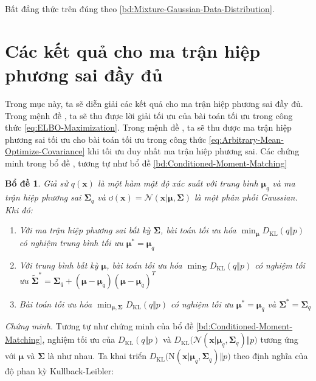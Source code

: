 \documentclass[14pt, a4paper]{article}
\numberwithin{equation}{section}
\numberwithin{figure}{section}
\newtheorem{bd}{Bổ đề}
\numberwithin{dl}{section}
\numberwithin{md}{section}
\numberwithin{bd}{section}
\numberwithin{dn}{section}
\numberwithin{hq}{section}
\begin{document}
    Bất đẳng thức trên đúng theo \ref{bd:Mixture-Gaussian-Data-Distribution}.

    \section{Các kết quả cho ma trận hiệp phương sai đầy đủ}

    Trong mục này, ta sẽ diễn giải các kết quả cho ma trận hiệp phương sai đầy đủ. 
    Trong mệnh đề , ta sẽ thu được lời giải tối ưu của bài toán tối ưu trong công thức \ref{eq:ELBO-Maximization}.
    Trong mệnh đề , ta sẽ thu được ma trận hiệp phương sai tối ưu cho bài toán tối ưu trong công thức \ref{eq:Arbitrary-Mean-Optimize-Covariance} khi tối ưu duy nhất ma trận hiệp phương sai.
    Các chứng minh trong bổ đề , tương tự như bổ đề \ref{bd:Conditioned-Moment-Matching}

    \begin{bd} \label{bd:Optimal-Solution-Full-Covariance}
        Giả sử $q(\boldsymbol{x})$ là một hàm mật độ xác suất với trung bình $\boldsymbol{\mu}_q$ và ma trận hiệp phương sai $\boldsymbol{\Sigma}_q$ và $ơ(\boldsymbol{x})=\mathcal{N}(\boldsymbol{x} \vert \boldsymbol{\mu}, \boldsymbol{\Sigma})$ là một phân phối Gaussian. Khi đó:

        \begin{enumerate}
            \item Với ma trận hiệp phương sai bất kỳ $\boldsymbol{\Sigma}$, bài toán tối ưu hóa $\displaystyle\min_{\boldsymbol{\mu}} D_{\mathrm{KL}} (q \Vert p)$ có nghiệm trung bình tối ưu $\boldsymbol{\mu}^{\ast}=\boldsymbol{\mu}_q$
            \item Với trung bình bất kỳ $\boldsymbol{\mu}$, bài toán tối ưu hóa $\displaystyle\min_{\boldsymbol{\Sigma}} D_{\mathrm{KL}} (q \Vert p)$ có nghiệm tối ưu $\tilde{\boldsymbol{\Sigma}}^{\ast}=\boldsymbol{\Sigma}_q + (\boldsymbol{\mu} - \boldsymbol{\mu}_q)(\boldsymbol{\mu} - \boldsymbol{\mu}_q)^T$
            \item Bài toán tối ưu hóa $\displaystyle\min_{\boldsymbol{\mu}, \boldsymbol{\Sigma}} D_{\mathrm{KL}} (q \Vert p)$ có nghiệm tối ưu $\boldsymbol{\mu}^{\ast}=\boldsymbol{\mu}_q$ và $\boldsymbol{\Sigma}^{\ast} = \boldsymbol{\Sigma}_q$
        \end{enumerate}
    \end{bd}

    \textit{Chứng minh.}
    Tương tự như chứng minh của bổ đề \ref{bd:Conditioned-Moment-Matching}, nghiệm tối ưu của $D_{\mathrm{KL}}(q \Vert p)$ và $D_{\mathrm{KL}}\big( \mathcal{N} (\boldsymbol{x} \vert \boldsymbol{\mu}_q, \boldsymbol{\Sigma}_q) \Vert p \big)$ tương ứng với $\boldsymbol{\mu}$ và $\boldsymbol{\Sigma}$ là như nhau.
    Ta khai triển $D_{\mathrm{KL}} \big( \mathrm{N}(\boldsymbol{x} \vert \boldsymbol{\mu}_q, \boldsymbol{\Sigma}_q ) \Vert p \big)$ theo định nghĩa của độ phan kỳ Kullback-Leibler:
\end{document}
